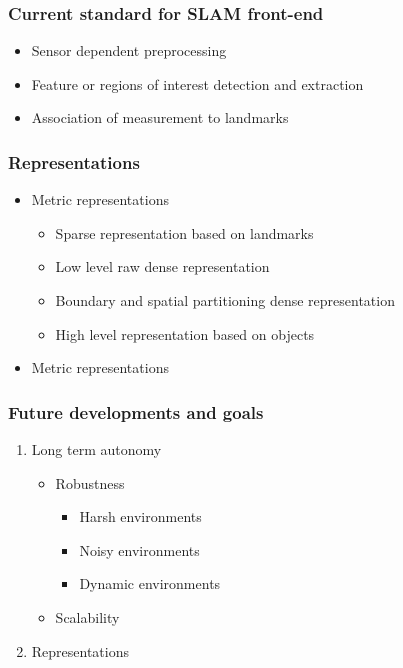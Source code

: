\documentclass{beamerthesis}
\begin{document}
\begin{frame}\frametitle{Current standard for SLAM front-end}
	\begin{itemize}
		\item Sensor dependent preprocessing
		\item Feature or regions of interest detection and extraction
		\item Association of measurement to landmarks
	\end{itemize}
\end{frame}

\begin{frame}\frametitle{Representations}
	\begin{itemize}
		\item Metric representations
		\begin{itemize}
			\item Sparse representation based on landmarks
			\item Low level raw dense representation
			\item Boundary and spatial partitioning dense representation
			\item High level representation based on objects
		\end{itemize}
		\item Metric representations
	\end{itemize}
\end{frame}

\begin{frame}\frametitle{Future developments and goals}
	\begin{enumerate}
		\item Long term autonomy
		\begin{itemize}
			\item Robustness
			\begin{itemize}
				\item Harsh environments
				\item Noisy environments
				\item Dynamic environments
			\end{itemize}
			\item Scalability
		\end{itemize}
		\item Representations
	\end{enumerate}
\end{frame}
\end{document}
